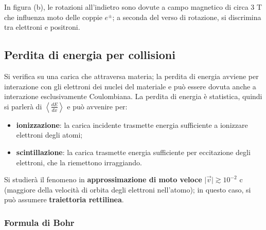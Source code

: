 \documentclass[10pt, a4paper]{scrartcl}
\numberwithin{equation}{subsection}
\theoremstyle{style1}
\begin{document}
\noindent In figura (b), le rotazioni all'indietro sono dovute a campo magnetico di circa $3$ T che influenza moto delle coppie $e^{\pm} $; a seconda del verso di rotazione, si discrimina tra elettroni e positroni.
\subsection{Perdita di energia per collisioni}
Si verifica su una carica che attraversa materia; la perdita di energia avviene per interazione con gli elettroni dei nuclei del materiale e pu\`o essere dovuta anche a interazione esclusivamente Coulombiana. La perdita di energia \`e statistica, quindi si parler\`a di $\left\langle \frac{d E}{d x}  \right\rangle$ e pu\`o avvenire per:
\begin{itemize}
	\item \textbf{ionizzazione}: la carica incidente trasmette energia sufficiente a ionizzare elettroni degli atomi;
	\item \textbf{scintillazione}: la carica trasmette energia sufficiente per eccitazione degli elettroni, che la riemettono irraggiando.
\end{itemize}
Si studier\`a il fenomeno in \textbf{approssimazione di moto veloce} $\lvert \vec{v}  \rvert \gtrsim 10^{-2} $ c (maggiore della velocit\`a di orbita degli elettroni nell'atomo); in questo caso, si pu\`o assumere \textbf{traiettoria rettilinea}.
\subsubsection{Formula di Bohr}
\end{document}
